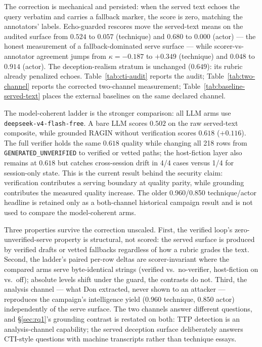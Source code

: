 The correction is mechanical and persisted: when the served text echoes
the query verbatim and carries a fallback marker, the score is zero,
matching the annotators' labels. Echo-guarded rescores move the
served-text means on the audited surface from $0.524$ to $0.057$
(technique) and $0.680$ to $0.000$ (actor) --- the honest measurement of
a fallback-dominated serve surface --- while scorer-vs-annotator agreement
jumps from $\kappa=-0.187$ to $+0.349$ (technique) and $0.048$ to
$0.914$ (actor). The deception-realism stratum is unchanged ($0.649$):
its rubric already penalized echoes. Table~\ref{tab:cti-audit} reports
the audit; Table~\ref{tab:two-channel} reports the corrected two-channel
measurement; Table~\ref{tab:baseline-served-text} places the external
baselines on the same declared channel.



The model-coherent ladder is the stronger comparison: all LLM arms use
\texttt{deepseek-v4-flash-free}. A bare LLM scores $0.502$ on the raw
served-text composite, while grounded RAGIN without verification scores
$0.618$ ($+0.116$). The full verifier holds the same $0.618$ quality while
changing all 218 rows from \texttt{GENERATED\_UNVERIFIED} to verified or
vetted paths; the host-fiction layer also remains at $0.618$ but catches
cross-session drift in 4/4 cases versus 1/4 for session-only state. This is
the current result behind the security claim: verification contributes a
serving boundary at quality parity, while grounding contributes the measured
quality increase. The older 0.960/0.850 technique/actor headline is retained
only as a both-channel historical campaign result and is not used to compare
the model-coherent arms.

Three properties survive the correction unscaled. First, the verified
loop's zero-unverified-serve property is structural, not scored: the
served surface is produced by verified drafts or vetted fallbacks
regardless of how a rubric grades the text. Second, the ladder's paired
per-row deltas are scorer-invariant where the compared arms serve
byte-identical strings (verified vs.\ no-verifier, host-fiction on vs.\ off); absolute levels shift under the guard, the contrasts do not.
Third, the analysis channel --- what Don extracted, never shown to an
attacker --- reproduces the campaign's intelligence yield ($0.960$
technique, $0.850$ actor) independently of the serve surface. The two
channels answer different questions, and \S\ref{sec:rq1}'s grounding
contrast is restated on both: TTP detection is an analysis-channel
capability; the served deception surface deliberately answers CTI-style
questions with machine transcripts rather than technique essays.

